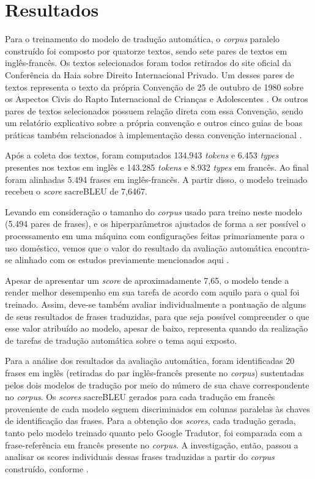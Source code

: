 \documentclass[portuguese]{textolivre}
\begin{document}
\section{Resultados}\label{sec-modelo}
Para o treinamento do modelo de tradução automática, o \textit{corpus} paralelo construído foi composto por quatorze textos, sendo sete pares de textos em inglês-francês. Os textos selecionados foram todos retirados do site oficial da Conferência da Haia sobre Direito Internacional Privado. Um desses pares de textos representa o texto da própria Convenção de 25 de outubro de 1980 sobre os Aspectos Civis do Rapto Internacional de Crianças e Adolescentes \cite{hcch_convention_1980}. Os outros pares de textos selecionados possuem relação direta com essa Convenção, sendo um relatório explicativo sobre a própria convenção e outros cinco guias de boas práticas também relacionados à implementação dessa convenção internacional \cite{perez-vera_hcch_1980,hcch_convention_1980,hcch_guide_2003a,hcch_guide_2003b,hcch_guide_2005,hcch_guide_2010,hcch_guide_2012}.

Após a coleta dos textos, foram computados 134.943 \textit{tokens} e 6.453 \textit{types} presentes nos textos em inglês e 143.285 \textit{tokens} e 8.932 \textit{types} em francês. Ao final foram alinhadas 5.494 frases em inglês-francês. A partir disso, o modelo treinado recebeu o \textit{score} sacreBLEU de 7,6467.

Levando em consideração o tamanho do \textit{corpus} usado para treino neste modelo (5.494 pares de frases), e os hiperparâmetros ajustados de forma a ser possível o processamento em uma máquina com configurações feitas primariamente para o uso doméstico, vemos que o valor do resultado da avaliação automática encontra-se alinhado com os estudos previamente mencionados aqui \cite{lakew_comparison_2018,banitz_machine_2020,tian_french--english_2022,kimera_building_2022}.

Apesar de apresentar um \textit{score} de aproximadamente 7,65, o modelo tende a render melhor desempenho em sua tarefa de acordo com aquilo para o qual foi treinado. Assim, deve-se também avaliar individualmente a pontuação de alguns de seus resultados de frases traduzidas, para que seja possível compreender o que esse valor atribuído ao modelo, apesar de baixo, representa quando da realização de tarefas de tradução automática sobre o tema aqui exposto.
 
Para a análise dos resultados da avaliação automática, foram identificadas 20 frases em inglês (retiradas do par inglês-francês presente no \textit{corpus}) sustentadas pelos dois modelos de tradução por meio do número de sua chave correspondente no \textit{corpus}. Os \textit{scores} sacreBLEU gerados para cada tradução em francês proveniente de cada modelo seguem discriminados em colunas paralelas às chaves de identificação das frases. Para a obtenção dos \textit{scores}, cada tradução gerada, tanto pelo modelo treinado quanto pelo Google Tradutor, foi comparada com a frase-referência em francês presente no \textit{corpus}. A investigação, então, passou a analisar os scores individuais dessas frases traduzidas a partir do \textit{corpus} construído, conforme .
\end{document}
